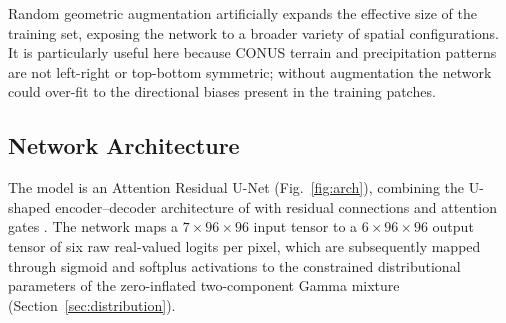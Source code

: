 \documentclass[11pt]{article}
\begin{document}
Random geometric augmentation artificially expands the effective
size of the training set, exposing the network to a broader variety
of spatial configurations.  It is particularly useful here because
CONUS terrain and precipitation patterns are not
left-right or top-bottom symmetric; without augmentation the
network could over-fit to the directional biases present in the
training patches.

\subsection{Network Architecture}
\label{sec:architecture}

The model is an Attention Residual U-Net (Fig.~\ref{fig:arch}),
combining the U-shaped encoder--decoder architecture of
\citet{ronneberger2015} with residual connections \citep{he2016} and
attention gates \citep{oktay2018}.  The network maps a
$7 \times 96 \times 96$ input tensor to a $6 \times 96 \times 96$
output tensor of six raw real-valued logits per pixel, which are
subsequently mapped through sigmoid and softplus activations to the
constrained distributional parameters of the zero-inflated
two-component Gamma mixture (Section~\ref{sec:distribution}).
\end{document}
